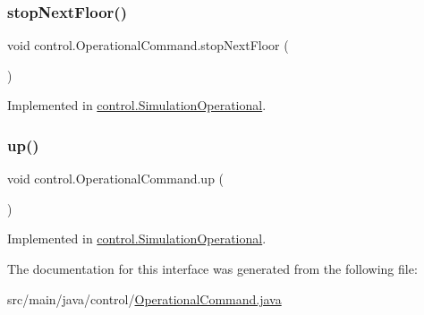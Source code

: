 \subsubsection{\texorpdfstring{stopNextFloor()}{stopNextFloor()}}
{\footnotesize\ttfamily void control.\+Operational\+Command.\+stop\+Next\+Floor (\begin{DoxyParamCaption}{ }\end{DoxyParamCaption})}



Implemented in \mbox{\hyperlink{classcontrol_1_1_simulation_operational_a2ca8414424f8becf5c5942b9dbba80aa}{control.\+Simulation\+Operational}}.

\mbox{\label{interfacecontrol_1_1_operational_command_a23231ea40f8bf5cd07b864238f258b5f}} 
\subsubsection{\texorpdfstring{up()}{up()}}
{\footnotesize\ttfamily void control.\+Operational\+Command.\+up (\begin{DoxyParamCaption}{ }\end{DoxyParamCaption})}



Implemented in \mbox{\hyperlink{classcontrol_1_1_simulation_operational_ab3ade4511703ee9715f82ce6e9a036a0}{control.\+Simulation\+Operational}}.



The documentation for this interface was generated from the following file\+:\begin{DoxyCompactItemize}
\item 
src/main/java/control/\mbox{\hyperlink{_operational_command_8java}{Operational\+Command.\+java}}\end{DoxyCompactItemize}
